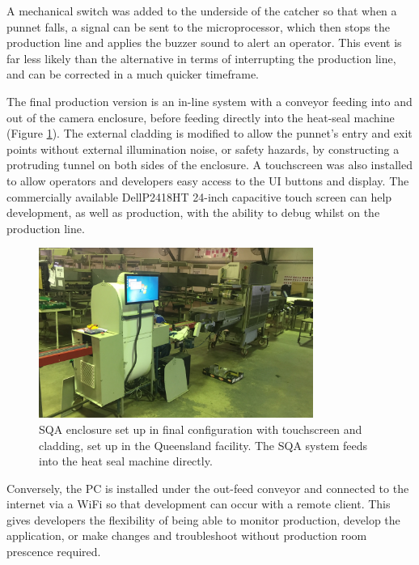 \documentclass[fleqn,twoside,12pt]{report}
\begin{document}
A mechanical switch was added to the underside of the catcher so that when a punnet falls, a signal can be sent to the microprocessor, which then stops the production line and applies the buzzer sound to alert an operator. This event is far less likely than the alternative in terms of interrupting the production line, and can be corrected in a much quicker timeframe.

The final production version is an in-line system with a conveyor feeding into and out of the camera enclosure, before feeding directly into the heat-seal machine (Figure \ref{fig:production_final}). The external cladding is modified to allow the punnet's entry and exit points without external illumination noise, or safety hazards, by constructing a protruding tunnel on both sides of the enclosure. A touchscreen was also installed to allow operators and developers easy access to the UI buttons and display. The commercially available Dell\textregistered P2418HT 24-inch capacitive touch screen can help development, as well as production, with the ability to debug whilst on the production line.


\begin{figure}[ht]
	\centering
	\includegraphics[width=0.8\textwidth]{images/production_final.JPG}
	\caption{SQA enclosure set up in final configuration with touchscreen and cladding, set up in the Queensland facility. The SQA system feeds into the heat seal machine directly.}
	\label{fig:production_final}
\end{figure}

Conversely, the PC is installed under the out-feed conveyor and connected to the internet via a WiFi so that development can occur with a remote client. This gives developers the flexibility of being able to monitor production, develop the application, or make changes and troubleshoot without production room prescence required.
\end{document}

